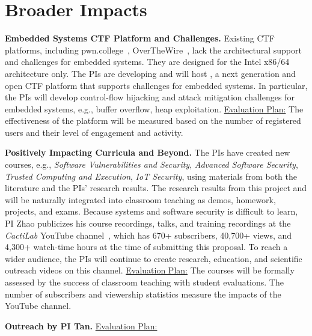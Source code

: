 \section{Broader Impacts}
\label{sec:bi}

\textbf{Embedded Systems CTF Platform and Challenges.}
Existing CTF platforms, including pwn.college~\cite{PwnCollege}, OverTheWire~\cite{OverTheWire},
lack the architectural support and challenges for embedded systems.
They are designed for the Intel x86/64 architecture only.
The PIs are developing and will host \ctfplatform,
a next generation and open CTF platform that supports challenges for embedded systems.
In particular, the PIs will develop control-flow hijacking and attack mitigation challenges for embedded systems, e.g., buffer overflow, heap exploitation.
\ul{Evaluation Plan:} The effectiveness of the platform will be measured based on the number of registered users and their level of engagement and activity. %

\textbf{Positively Impacting Curricula and Beyond.}
The PIs have created new courses, e.g., \emph{Software Vulnerabilities and Security}, \emph{Advanced Software Security}, \emph{Trusted Computing and Execution}, \emph{IoT Security},
using materials from both the literature and the PIs' research results.
The research results from this project and \ctfplatform will be naturally integrated into classroom teaching as demos, homework, projects, and exams.
Because systems and software security is difficult to learn, 
PI Zhao publicizes his course recordings, talks, and training recordings at the \emph{CactiLab} YouTube channel~\cite{youtubelist},
which has 670+ subscribers, 40,700+ views, and 4,300+ watch-time hours at the time of submitting this proposal.
To reach a wider audience, the PIs will continue to create research, education, and scientific outreach videos on this channel. 
\ul{Evaluation Plan:} The courses will be formally assessed by the success of classroom teaching with student evaluations. The number of subscribers and viewership statistics measure the impacts of the YouTube channel.

\textbf{Outreach by PI Tan.}
\ul{Evaluation Plan:} 

